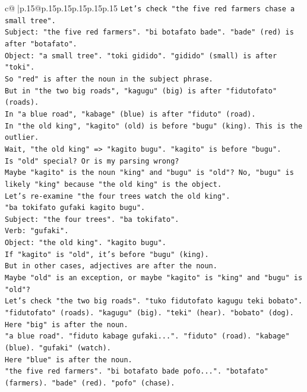 \documentclass{article}
\begin{document}
{\begin{supertabular}{c@{$\;$}|p{.15\linewidth}@{}p{.15\linewidth}p{.15\linewidth}p{.15\linewidth}p{.15\linewidth}p{.15\linewidth}}
{{{\texttt{Let's check "the five red farmers chase a small tree".} \\
\texttt{Subject: "the five red farmers". "bi botafato bade". "bade" (red) is after "botafato".} \\
\texttt{Object: "a small tree". "toki gidido". "gidido" (small) is after "toki".} \\
\texttt{So "red" is after the noun in the subject phrase.} \\
\texttt{But in "the two big roads", "kagugu" (big) is after "fidutofato" (roads).} \\
\texttt{In "a blue road", "kabage" (blue) is after "fiduto" (road).} \\
\texttt{In "the old king", "kagito" (old) is before "bugu" (king). This is the outlier.} \\
\texttt{Wait, "the old king" => "kagito bugu". "kagito" is before "bugu".} \\
\texttt{Is "old" special? Or is my parsing wrong?} \\
\texttt{Maybe "kagito" is the noun "king" and "bugu" is "old"? No, "bugu" is likely "king" because "the old king" is the object.} \\
\texttt{Let's re{-}examine "the four trees watch the old king".} \\
\texttt{"ba tokifato gufaki kagito bugu".} \\
\texttt{Subject: "the four trees". "ba tokifato".} \\
\texttt{Verb: "gufaki".} \\
\texttt{Object: "the old king". "kagito bugu".} \\
\texttt{If "kagito" is "old", it's before "bugu" (king).} \\
\texttt{But in other cases, adjectives are after the noun.} \\
\texttt{Maybe "old" is an exception, or maybe "kagito" is "king" and "bugu" is "old"?} \\
\texttt{Let's check "the two big roads". "tuko fidutofato kagugu teki bobato".} \\
\texttt{"fidutofato" (roads). "kagugu" (big). "teki" (hear). "bobato" (dog).} \\
\texttt{Here "big" is after the noun.} \\
\texttt{"a blue road". "fiduto kabage gufaki...". "fiduto" (road). "kabage" (blue). "gufaki" (watch).} \\
\texttt{Here "blue" is after the noun.} \\
\texttt{"the five red farmers". "bi botafato bade pofo...". "botafato" (farmers). "bade" (red). "pofo" (chase).} \\
}}}
\end{supertabular}}
\end{document}
